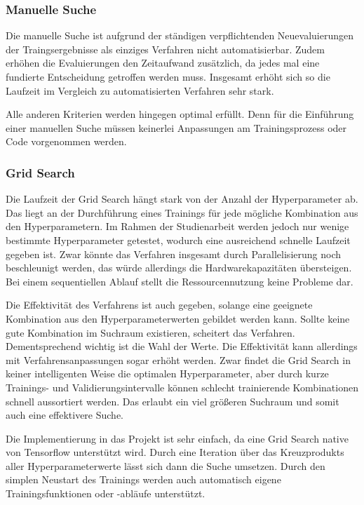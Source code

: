 \subsubsection{Manuelle Suche}
Die manuelle Suche ist aufgrund der ständigen verpflichtenden Neuevaluierungen der Traingsergebnisse als einziges Verfahren  nicht automatisierbar.
Zudem erhöhen die Evaluierungen den Zeitaufwand zusätzlich, da jedes mal eine fundierte Entscheidung getroffen werden muss.
Insgesamt erhöht sich so die Laufzeit im Vergleich zu automatisierten Verfahren sehr stark.
\newline

Alle anderen Kriterien werden hingegen optimal erfüllt.
Denn für die Einführung einer manuellen Suche müssen keinerlei Anpassungen am Trainingsprozess oder Code vorgenommen werden.

\subsubsection{Grid Search}
Die Laufzeit der Grid Search hängt stark von der Anzahl der Hyperparameter ab.
Das liegt an der Durchführung eines Trainings für jede mögliche Kombination aus den Hyperparametern.
Im Rahmen der Studienarbeit werden jedoch nur wenige bestimmte Hyperparameter getestet, wodurch eine ausreichend schnelle Laufzeit gegeben ist.
Zwar könnte das Verfahren insgesamt durch Parallelisierung noch beschleunigt werden, das würde allerdings die Hardwarekapazitäten übersteigen.
Bei einem sequentiellen Ablauf stellt die Ressourcennutzung keine Probleme dar.
\newline

Die Effektivität des Verfahrens ist auch gegeben, solange eine geeignete Kombination aus den Hyperparameterwerten gebildet werden kann.
Sollte keine gute Kombination im Suchraum existieren, scheitert das Verfahren.
Dementsprechend wichtig ist die Wahl der Werte.
Die Effektivität kann allerdings mit Verfahrensanpassungen sogar erhöht werden.
Zwar findet die Grid Search in keiner intelligenten Weise die optimalen Hyperparameter, aber durch kurze Trainings- und Validierungsintervalle können schlecht trainierende Kombinationen schnell aussortiert werden.
Das erlaubt ein viel größeren Suchraum und somit auch eine effektivere Suche.
\newline

Die Implementierung in das Projekt ist sehr einfach, da eine Grid Search native von Tensorflow unterstützt wird.
Durch eine Iteration über das Kreuzprodukts aller Hyperparameterwerte lässt sich dann die Suche umsetzen.
Durch den simplen Neustart des Trainings werden auch automatisch eigene Trainingsfunktionen oder -abläufe unterstützt.

